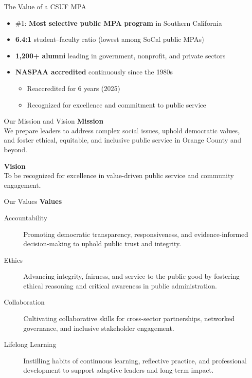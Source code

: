 \documentclass[10pt]{beamer}
\begin{document}
\begin{frame}{The Value of a CSUF MPA}
\begin{Large}
\begin{itemize}
  \item \#1: \textbf{Most selective public MPA program} in Southern California
  \item \textbf{6.4:1} student--faculty ratio (lowest among SoCal public MPAs)
  \item \textbf{1,200+ alumni} leading in government, nonprofit, and private sectors
  \item \textbf{NASPAA accredited} continuously since the 1980s
    \begin{itemize}
      \item Reaccredited for 6 years (2025)
      \item Recognized for excellence and commitment to public service
    \end{itemize}
\end{itemize}
\end{Large}
\end{frame}

\begin{frame}{Our Mission and Vision}
\textbf{Mission}\\
We prepare leaders to address complex social issues, uphold democratic values, and foster ethical, equitable, and inclusive public service in Orange County and beyond.

\vspace{0.8em}
\textbf{Vision}\\
To be recognized for excellence in value-driven public service and community engagement.
\end{frame}

\begin{frame}{Our Values}
\textbf{Values}
\begin{description}
  \item[Accountability] Promoting democratic transparency, responsiveness, and evidence-informed decision-making to uphold public trust and integrity.
  \item[Ethics] Advancing integrity, fairness, and service to the public good by fostering ethical reasoning and critical awareness in public administration.
  \item[Collaboration] Cultivating collaborative skills for cross-sector partnerships, networked governance, and inclusive stakeholder engagement.
  \item[Lifelong Learning] Instilling habits of continuous learning, reflective practice, and professional development to support adaptive leaders and long-term impact.
\end{description}
\end{frame}
\end{document}
